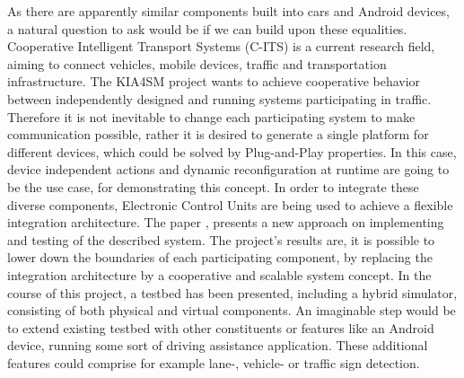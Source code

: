 As there are apparently similar components built into cars and Android devices, a natural question to ask would be if we can build upon these equalities. \newline
Cooperative Intelligent Transport Systems (C-ITS) is a current research field, aiming to connect vehicles, mobile devices, traffic and transportation infrastructure\cite{kia4sm}. The KIA4SM project wants to achieve cooperative behavior between independently designed and running systems participating in traffic. Therefore it is not inevitable to change each participating system to make communication possible, rather it is desired to generate a single platform for different devices, which could be solved by Plug-and-Play properties. In this case, device independent actions and dynamic reconfiguration at runtime are going to be the use case, for demonstrating this concept. In order to integrate these diverse components, Electronic Control Units are being used to achieve a flexible integration architecture. 
The paper \cite{kia4sm}, presents a new approach on implementing and testing of the described system.
The project's results are, it is possible to lower down the boundaries of each participating component, by replacing the integration architecture by a cooperative and scalable system concept. In the course of this project, a testbed has been presented, including a hybrid simulator, consisting of both physical and virtual components. An imaginable step would be to extend existing testbed with other constituents or features like an Android device, running some sort of driving assistance application. These additional features could comprise for example lane-, vehicle- or traffic sign detection. 
